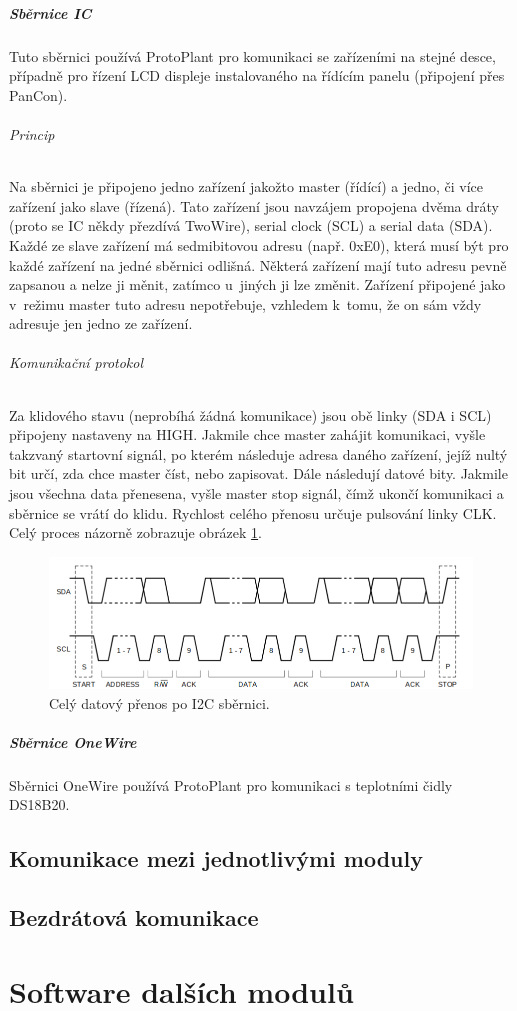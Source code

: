 \paragraph{Sběrnice IC}
Tuto sběrnici používá ProtoPlant pro komunikaci se zařízeními na stejné desce, případně pro řízení LCD displeje instalovaného na řídícím panelu (připojení přes PanCon). 

\subparagraph{Princip}
Na sběrnici je připojeno jedno zařízení jakožto master (řídící) a jedno, či více zařízení jako slave (řízená).
Tato zařízení jsou navzájem propojena dvěma dráty (proto se IC někdy přezdívá TwoWire), serial clock (SCL) a serial data (SDA).
Každé ze slave zařízení má sedmibitovou adresu (např. 0xE0), která musí být pro každé zařízení na jedné sběrnici odlišná.
Některá zařízení mají tuto adresu pevně zapsanou a nelze ji měnit, zatímco u~jiných ji lze změnit.
Zařízení připojené jako v~režimu master tuto adresu nepotřebuje, vzhledem k~tomu, že on sám vždy adresuje jen jedno ze zařízení.

\subparagraph{Komunikační protokol}
Za klidového stavu (neprobíhá žádná komunikace) jsou obě linky (SDA i SCL) připojeny nastaveny na HIGH.
Jakmile chce master zahájit komunikaci, vyšle takzvaný startovní signál, po kterém následuje adresa daného zařízení, jejíž nultý bit určí, zda chce master číst, nebo zapisovat.
Dále následují datové bity.
Jakmile jsou všechna data přenesena, vyšle master stop signál, čímž ukončí komunikaci a sběrnice se vrátí do klidu.
Rychlost celého přenosu určuje pulsování linky CLK.
Celý proces názorně zobrazuje obrázek \ref{fig:I2C-protocol}.

\begin{figure}[h]
   \centering
   \includegraphics[width=\textwidth]{img/I2C.png}
   \caption{Celý datový přenos po I2C sběrnici.}
   \label{fig:I2C-protocol}
\end{figure}

\paragraph{Sběrnice OneWire}
Sběrnici OneWire používá ProtoPlant pro komunikaci s teplotními čidly DS18B20. 

\section{Komunikace mezi jednotlivými moduly}

\section{Bezdrátová komunikace}

\chapter{Software dalších modulů}
\label{chap:moduleSoftware}

\newpage
